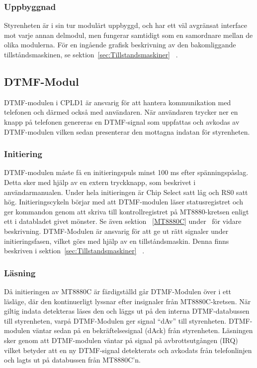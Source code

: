 \documentclass[a4paper,11pt]{article}
\begin{document}
	\subsubsection{Uppbyggnad}

	Styrenheten är i sin tur modulärt uppbyggd, och har ett väl avgränsat interface mot varje annan delmodul, men fungerar samtidigt som en samordnare mellan de olika modulerna.	För en ingående grafisk beskrivning av den bakomliggande tillståndsmaskinen, se sektion~\ref{sec:Tillstandsmaskiner} ~.

	\subsection{DTMF-Modul}
		
	DTMF-modulen i CPLD1 är ansvarig för att hantera kommunikation med telefonen och därmed också med användaren.
	När användaren trycker ner en knapp på telefonen genereras en DTMF-signal som uppfattas och avkodas av DTMF-modulen vilken sedan presenterar den mottagna indatan för styrenheten.
		
	\subsubsection{Initiering}

	DTMF-modulen måste få en initieringspuls minst 100 ms efter spänningspåslag. Detta sker med hjälp av
	en extern tryckknapp, som beskrivet i användarmanualen. Under hela initieringen är Chip Select satt låg
	och RS0 satt hög. Initieringscykeln börjar med att DTMF-modulen läser statusregistret och ger kommandon genom att skriva till kontrollregistret på MT8880-kretsen enligt ett i databladet givet mönster. Se även sektion ~\ref{MT8880C} under~ för vidare beskrivning.
	DTMF-Modulen är ansvarig för att ge ut rätt signaler under initieringsfasen, vilket görs med hjälp av en tillståndsmaskin. Denna finns beskriven i sektion~\ref{sec:Tillstandsmaskiner} ~.
		
	\subsubsection{Läsning}

	Då initieringen av MT8880C är färdigställd går DTMF-Modulen över i ett läsläge, där den kontinuerligt lyssnar efter insignaler från MT8880C-kretsen. När giltig indata detekteras läses den och läggs ut på den interna DTMF-databussen till styrenheten, varpå DTMF-Modulen ger signal  ``dAv'' till styrenheten. DTMF-modulen väntar sedan på en bekräftelsesignal (dAck) från styrenheten. Läsningen sker genom att DTMF-modulen väntar på signal på avbrottsutgången (IRQ) vilket betyder att en ny DTMF-signal detekterats  och avkodats från telefonlinjen och lagts ut på databussen från MT8880C'n.
\end{document}
